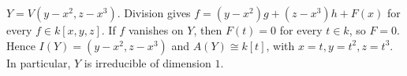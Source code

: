 $Y=V(y-x^2,z-x^3)$. Division gives $f=(y-x^2)g+(z-x^3)h+F(x)$ for every $f\in k[x,y,z]$. If $f$ vanishes on $Y$, then $F(t)=0$ for every $t\in k$, so $F=0$. Hence $I(Y)=(y-x^2,z-x^3)$ and $A(Y)\cong k[t]$, with $x=t,y=t^2,z=t^3$. In particular, $Y$ is irreducible of dimension $1$.
